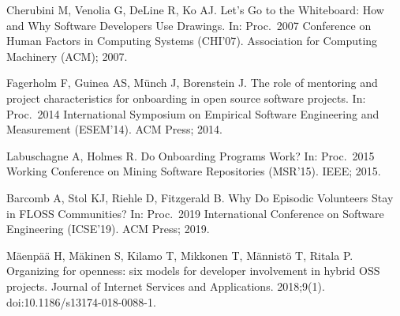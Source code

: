 \documentclass[10pt,letterpaper]{article}
\begin{document}
\begin{thebibliography}{10}
Cherubini M, Venolia G, DeLine R, Ko AJ.
\newblock Let's Go to the Whiteboard: How and Why Software Developers Use
  Drawings.
\newblock In: Proc.\ 2007 Conference on Human Factors in Computing Systems
  ({CHI'07}). Association for Computing Machinery ({ACM}); 2007.

Fagerholm F, Guinea AS, M\"{u}nch J, Borenstein J.
\newblock The role of mentoring and project characteristics for onboarding in
  open source software projects.
\newblock In: Proc.\ 2014 International Symposium on Empirical Software
  Engineering and Measurement ({ESEM'14}). {ACM} Press; 2014.

Labuschagne A, Holmes R.
\newblock Do Onboarding Programs Work?
\newblock In: Proc.\ 2015 Working Conference on Mining Software Repositories
  ({MSR'15}). {IEEE}; 2015.

Barcomb A, Stol KJ, Riehle D, Fitzgerald B.
\newblock Why Do Episodic Volunteers Stay in FLOSS Communities?
\newblock In: Proc.\ 2019 International Conference on Software Engineering
  ({ICSE'19}). {ACM} Press; 2019.

M\"{a}enp\"{a}\"{a} H, M\"{a}kinen S, Kilamo T, Mikkonen T, M\"{a}nnist\"{o} T,
  Ritala P.
\newblock Organizing for openness: six models for developer involvement in
  hybrid {OSS} projects.
\newblock Journal of Internet Services and Applications. 2018;9(1).
\newblock doi:{10.1186/s13174-018-0088-1}.

\end{thebibliography}
\end{document}
